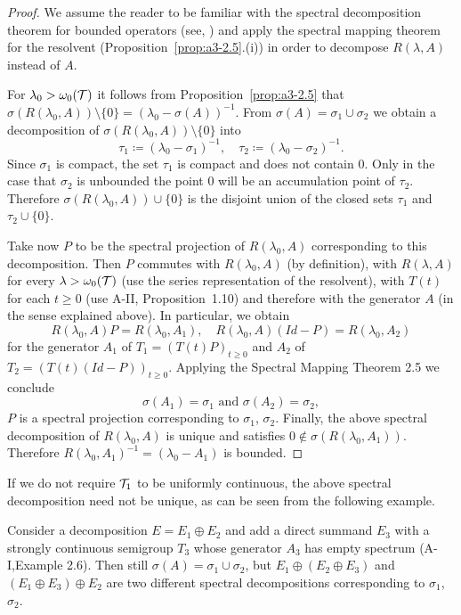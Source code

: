 \begin{proof}
We assume the reader to be familiar with the spectral decomposition theorem for bounded operators (see, \eg \citet[p.572]{dunfordschwartz:1958}) and apply the spectral mapping theorem for the resolvent (Proposition~\ref{prop:a3-2.5}.(i)) in order to decompose $R(\lambda,A)$ instead of $A$.

For $\lambda_{0} > \omega_{0}(\mathcal{T})$ it follows from Proposition~\ref{prop:a3-2.5} that $\sigma(R(\lambda_{0},A)) \setminus \{0\} = (\lambda_{0} - \sigma(A))^{-1}$.
From $\sigma(A) = \sigma_{1} \cup \sigma_{2}$ we obtain a decomposition of $\sigma(R(\lambda_{0},A)) \setminus \{0\}$ into
\[
\tau_{1} \coloneqq (\lambda_{0}-\sigma_{1})^{-1}, \quad \tau_{2} \coloneqq (\lambda_{0}-\sigma_{2})^{-1} .
\]
Since $\sigma_{1}$ is compact, the set $\tau_{1}$ is compact and does not contain $0$.
Only in the case that $\sigma_{2}$ is unbounded the point $0$ will be an accumulation point of $\tau_{2}$.
Therefore $\sigma(R(\lambda_{0},A)) \cup \{0\}$ is the disjoint union of the closed sets $\tau_{1}$ and $\tau_{2} \cup \{0\}$.

Take now $P$ to be the spectral projection of $R(\lambda_{0},A)$ corresponding to this decomposition.
Then $P$ commutes with $R(\lambda_{0},A)$ (by definition), with $R(\lambda,A)$ for every $\lambda > \omega_{0}(\mathcal{T})$ (use the series representation of the resolvent), with $T(t)$ for each $t \geq 0$ (use A-II, Proposition~1.10) and therefore with the generator $A$ (in the sense explained above).
In particular, we obtain
\[
R(\lambda_{0},A)P = R(\lambda_{0},A_{1}), \quad R(\lambda_{0},A)(Id-P) = R(\lambda_{0},A_{2})
\]
for the generator $A_{1}$ of $T_{1} = (T(t)P)_{t \geq 0}$ and $A_{2}$ of $T_{2} = (T(t)(Id-P))_{t \geq 0}$.
Applying the Spectral Mapping Theorem 2.5 we conclude
\[
\sigma(A_{1}) = \sigma_{1} \text{ and } \sigma(A_{2}) = \sigma_{2} ,
\]
\ie $P$ is a spectral projection corresponding to $\sigma_{1}$, $\sigma_{2}$.
Finally, the above spectral decomposition of $R(\lambda_{0},A)$ is unique and satisfies $0 \notin \sigma(R(\lambda_{0},A_{1}))$.
Therefore $R(\lambda_{0},A_{1})^{-1} = (\lambda_{0}-A_{1})$ is bounded.
\end{proof}
\begin{example*}
If we do not require $\mathcal{T}_{1}$ to be uniformly continuous, the above spectral decomposition need not be unique, as can be seen from the following example. 

Consider a decomposition $E = E_{1} \oplus E_{2}$ and add a direct summand $E_{3}$ with a strongly continuous semigroup $T_{3}$ whose generator $A_{3}$ has empty spectrum (\eg A-I,Example 2.6).
Then still $\sigma(A) = \sigma_{1} \cup \sigma_{2}$, but $E_{1} \oplus (E_{2} \oplus E_{3})$ and $(E_{1} \oplus E_{3}) \oplus E_{2}$ are two different spectral decompositions corresponding to $\sigma_{1}$, $\sigma_{2}$.
\end{example*}
